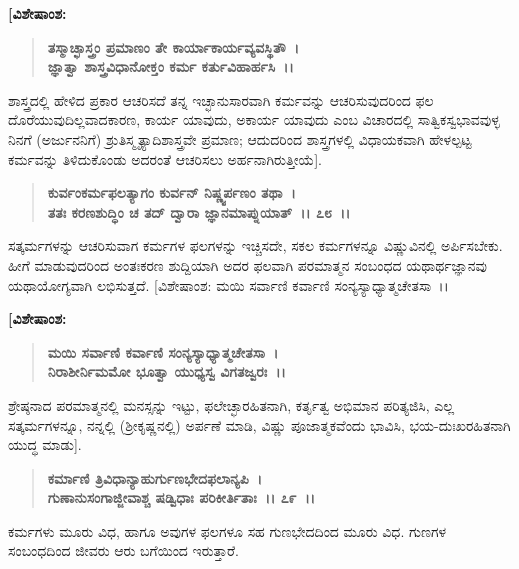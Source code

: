 \begin{flushleft}
\textbf{[ವಿಶೇಷಾಂಶ:} 
\end{flushleft}

\begin{verse}
\textbf{ತಸ್ಮಾಚ್ಛಾಸ್ತ್ರಂ ಪ್ರಮಾಣಂ ತೇ ಕಾರ್ಯಾಕಾರ್ಯವ್ಯವಸ್ಥಿತೌ~।}\\\textbf{ಜ್ಞಾತ್ವಾ ಶಾಸ್ತ್ರವಿಧಾನೋಕ್ತಂ ಕರ್ಮ ಕರ್ತುವಿಹಾರ್ಹಸಿ~।।} 
\end{verse}

ಶಾಸ್ತ್ರದಲ್ಲಿ ಹೇಳಿದ ಪ್ರಕಾರ ಆಚರಿಸದೆ ತನ್ನ ಇಚ್ಛಾನುಸಾರವಾಗಿ ಕರ್ಮವನ್ನು ಆಚರಿಸುವುದರಿಂದ ಫಲ ದೊರೆಯುವುದಿಲ್ಲವಾದಕಾರಣ, ಕಾರ್ಯ ಯಾವುದು, ಅಕಾರ್ಯ ಯಾವುದು ಎಂಬ ವಿಚಾರದಲ್ಲಿ ಸಾತ್ವಿಕಸ್ವಭಾವವುಳ್ಳ ನಿನಗೆ (ಅರ್ಜುನನಿಗೆ) ಶ್ರುತಿಸ್ಮೃತ್ಯಾದಿಶಾಸ್ತ್ರವೇ ಪ್ರಮಾಣ; ಆದುದರಿಂದ ಶಾಸ್ತ್ರಗಳಲ್ಲಿ ವಿಧಾಯಕವಾಗಿ ಹೇಳಲ್ಪಟ್ಟ ಕರ್ಮವನ್ನು ತಿಳಿದುಕೊಂಡು ಅದರಂತೆ ಆಚರಿಸಲು ಅರ್ಹನಾಗಿರುತ್ತೀಯೆ].

\begin{verse}
\textbf{ಕುರ್ವಂಕರ್ಮಫಲತ್ಯಾಗಂ ಕುರ್ವನ್ ನಿಷ್ಣ್ವರ್ಪಣಂ ತಥಾ~।}\\\textbf{ತತಃ ಕರಣಶುದ್ಧಿಂ ಚ ತದ್ ದ್ವಾರಾ ಜ್ಞಾನಮಾಪ್ನುಯಾತ್~।। ೭೮~।।}
\end{verse}

ಸತ್ಕರ್ಮಗಳನ್ನು ಆಚರಿಸುವಾಗ ಕರ್ಮಗಳ ಫಲಗಳನ್ನು ಇಚ್ಚಿಸದೇ, ಸಕಲ ಕರ್ಮಗಳನ್ನೂ ವಿಷ್ಣುವಿನಲ್ಲಿ ಅರ್ಪಿಸಬೇಕು. ಹೀಗೆ ಮಾಡುವುದರಿಂದ ಅಂತಃಕರಣ ಶುದ್ದಿಯಾಗಿ ಅದರ ಫಲವಾಗಿ ಪರಮಾತ್ಮನ ಸಂಬಂಧದ ಯಥಾರ್ಥಜ್ಞಾನವು ಯಥಾಯೋಗ್ಯವಾಗಿ ಲಭಿಸುತ್ತದೆ. [ವಿಶೇಷಾಂಶ: ಮಯಿ ಸರ್ವಾಣಿ ಕರ್ವಾಣಿ ಸಂನ್ಯಸ್ಯಾಧ್ಯಾತ್ಮಚೇತಸಾ~।।

\begin{flushleft}
\textbf{[ವಿಶೇಷಾಂಶ:} 
\end{flushleft}

\begin{verse}
\textbf{ಮಯಿ ಸರ್ವಾಣಿ ಕರ್ವಾಣಿ ಸಂನ್ಯಸ್ಯಾಧ್ಯಾತ್ಮಚೇತಸಾ~।}\\\textbf{ನಿರಾಶೀರ್ನಿಮಮೋ ಭೂತ್ವಾ ಯುಧ್ಯಸ್ವ ವಿಗತಜ್ವರಃ~।।} 
\end{verse}

ಶ್ರೇಷ್ಠನಾದ ಪರಮಾತ್ಮನಲ್ಲಿ ಮನಸ್ಸನ್ನು ಇಟ್ಟು, ಫಲೇಚ್ಛಾರಹಿತನಾಗಿ, ಕರ್ತೃತ್ವ ಅಭಿಮಾನ ಪರಿತ್ಯಜಿಸಿ, ಎಲ್ಲ ಸತ್ಕರ್ಮಗಳನ್ನೂ, ನನ್ನಲ್ಲಿ (ಶ‍್ರೀಕೃಷ್ಣನಲ್ಲಿ) ಅರ್ಪಣೆ ಮಾಡಿ, ವಿಷ್ಣು ಪೂಜಾತ್ಮಕವೆಂದು ಭಾವಿಸಿ, ಭಯ-ದುಃಖರಹಿತನಾಗಿ ಯುದ್ಧ ಮಾಡು].

\begin{verse}
\textbf{ಕರ್ಮಾಣಿ ತ್ರಿವಿಧಾನ್ಯಾಹುರ್ಗುಣಭೇದಫಲಾನ್ಯಪಿ~।}\\\textbf{ಗುಣಾನುಸಂಗಾಜ್ಜೀವಾಶ್ಚ ಷಡ್ವಿಧಾಃ ಪರಿಕೀರ್ತಿತಾಃ~।। ೭೯~।।}
\end{verse}

ಕರ್ಮಗಳು ಮೂರು ವಿಧ, ಹಾಗೂ ಅವುಗಳ ಫಲಗಳೂ ಸಹ ಗುಣಭೇದದಿಂದ ಮೂರು ವಿಧ. ಗುಣಗಳ ಸಂಬಂಧದಿಂದ ಜೀವರು ಆರು ಬಗೆಯಿಂದ ಇರುತ್ತಾರೆ.

